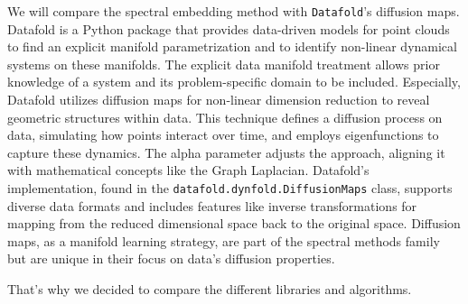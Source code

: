We will compare the spectral embedding method with \texttt{Datafold}'s diffusion maps. Datafold is a Python package that provides data-driven models for point clouds to find an explicit manifold parametrization and to identify non-linear dynamical systems on these manifolds. The explicit data manifold treatment allows prior knowledge of a system and its problem-specific domain to be included. Especially, Datafold utilizes diffusion maps for non-linear dimension reduction to reveal geometric structures within data. This technique defines a diffusion process on data, simulating how points interact over time, and employs eigenfunctions to capture these dynamics. The alpha parameter adjusts the approach, aligning it with mathematical concepts like the Graph Laplacian. Datafold's implementation, found in the \texttt{datafold.dynfold.DiffusionMaps} class, supports diverse data formats and includes features like inverse transformations for mapping from the reduced dimensional space back to the original space. Diffusion maps, as a manifold learning strategy, are part of the spectral methods family but are unique in their focus on data's diffusion properties.

That's why we decided to compare the different libraries and algorithms. 




